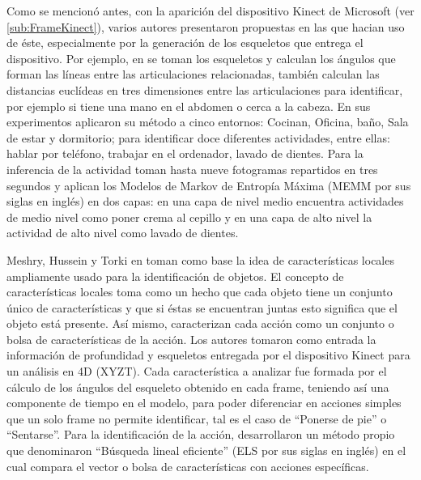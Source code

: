         Como se mencionó antes, con la aparición del dispositivo Kinect de Microsoft (ver \ref{sub:FrameKinect}), varios autores presentaron propuestas en las que hacian uso de éste, especialmente por la generación de los esqueletos que entrega el dispositivo. Por ejemplo, en \cite{Sung2012HARKinect} se toman los esqueletos y calculan los ángulos que forman las líneas entre las articulaciones relacionadas, también calculan las distancias euclídeas en tres dimensiones entre las articulaciones para identificar, por ejemplo si tiene una mano en el abdomen o cerca a  la cabeza. En sus experimentos aplicaron su método a cinco entornos: Cocinan, Oficina, baño, Sala de estar y dormitorio; para identificar doce diferentes actividades, entre ellas: hablar por teléfono, trabajar en el ordenador, lavado de dientes. Para la inferencia de la actividad toman hasta nueve fotogramas repartidos en tres segundos y aplican los Modelos de Markov de Entropía Máxima (MEMM por sus siglas en inglés) en dos capas: en una capa de nivel medio encuentra actividades de medio nivel como poner crema al cepillo y en una capa de alto nivel la actividad de alto nivel como lavado de dientes.
        
        Meshry, Hussein y Torki en \cite{Meshry2016} toman como base la idea de características locales ampliamente usado para la identificación de objetos. El concepto de características locales toma como un hecho que cada objeto tiene un conjunto único de características y que si éstas se encuentran juntas esto significa que el objeto está presente. Así mismo, caracterizan cada acción como un conjunto o bolsa de características de la acción. Los autores tomaron como entrada la información de profundidad y esqueletos entregada por el dispositivo Kinect para un análisis en 4D (XYZT). Cada característica a analizar fue formada por el cálculo de los ángulos del esqueleto obtenido en cada frame, teniendo así una componente de tiempo en el modelo, para poder diferenciar en acciones simples que un solo frame no permite identificar, tal es el caso de ``Ponerse de pie'' o ``Sentarse''. Para la identificación de la acción, desarrollaron un método propio que denominaron ``Búsqueda lineal eficiente'' (ELS por sus siglas en inglés) en el cual compara el vector o bolsa de características con acciones específicas.
        
